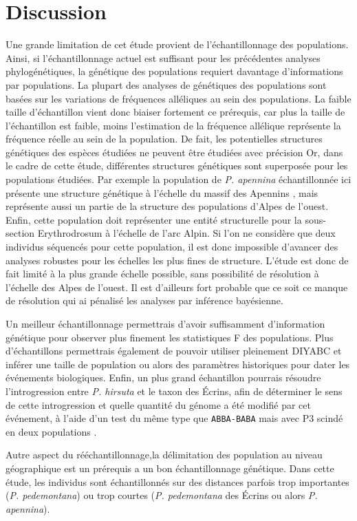 \section{Discussion}

Une grande limitation de cet étude provient de l'échantillonnage des populations.
Ainsi, si l'échantillonnage actuel est suffisant pour les précédentes analyses phylogénétiques, la génétique des populations requiert davantage d'informations par populations. 
La plupart des analyses de génétiques des populations sont basées sur les variations de fréquences alléliques au sein des populations.
La faible taille d'échantillon vient donc biaiser fortement ce prérequis, car plus la taille de l'échantillon est faible, moins l'estimation de la fréquence allélique représente la fréquence réelle au sein de la population.
De fait, les potentielles structures génétiques des espèces étudiées ne peuvent être étudiées avec précision
Or, dans le cadre de cette étude, différentes structures génétiques sont superposée pour les populations étudiées. 
Par exemple la population de \textit{P. apennina} échantillonnée ici présente une structure génétique à l'échelle du massif des Apennins \citep{Crema2009}, mais représente aussi un partie de la structure des populations d'Alpes de l'ouest.
Enfin, cette population doit représenter une entité structurelle pour la sous-section Erythrodrosum à l'échelle de l'arc Alpin.
Si l'on ne considère que deux individus séquencés pour cette population, il est donc impossible d'avancer des analyses robustes pour les échelles les plus fines de structure.
L'étude est donc de fait limité à la plus grande échelle possible, sans possibilité de résolution à l'échelle des Alpes de l'ouest.
Il est d'ailleurs fort probable que ce soit ce manque de résolution qui ai pénalisé les analyses par inférence bayésienne.


Un meilleur échantillonnage permettrais d'avoir suffisamment d'information génétique pour observer plus finement les statistiques F des populations.
Plus d'échantillons permettrais également de pouvoir utiliser pleinement DIYABC et inférer une taille de population ou alors des paramètres historiques pour dater les événements biologiques. 
Enfin, un plus grand échantillon pourrais résoudre l'introgression entre \textit{P. hirsuta} et le taxon des Écrins, afin de déterminer le sens de cette introgression et quelle quantité du génome a été modifié par cet événement, à l'aide d'un test du même type que \verb|ABBA-BABA| mais avec P3 scindé en deux populations \citep{Eaton2015}. 

Autre aspect du rééchantillonnage,la délimitation des population au niveau géographique est un prérequis a un bon échantillonnage génétique.
Dans cette étude, les individus sont échantillonnés sur des distances parfois trop importantes (\textit{P. pedemontana}) ou trop courtes (\textit{P. pedemontana} des Écrins ou alors \textit{P. apennina}).

